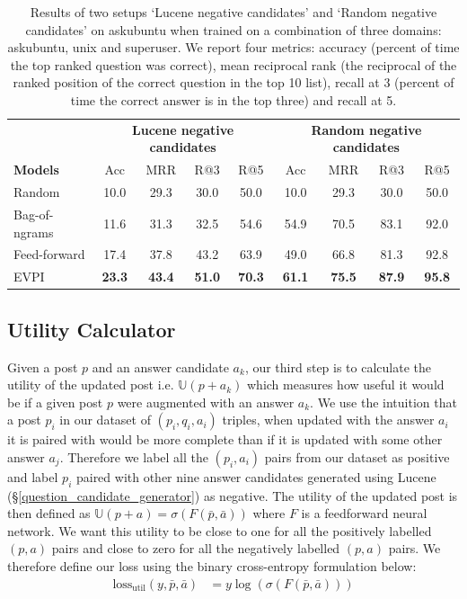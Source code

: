 \documentclass[11pt,a4paper]{article}
\newcommand{\U}{\mathbb{U}}
\begin{document}
\begin{table}[t]
	\small
	\centering
	\begin{tabular}{l|cccc|cccc}
		\toprule
		& \multicolumn{4}{c|}{\textbf{Lucene negative candidates}} & \multicolumn{4}{c}{\textbf{Random negative candidates}} \\
		\textbf{Models} & Acc & MRR & R@3 & R@5 & Acc & MRR & R@3 & R@5\\
		\midrule
		Random  & 10.0 & 29.3 & 30.0 & 50.0 &10.0 & 29.3 & 30.0 & 50.0 \\
		Bag-of-ngrams & 11.6 & 31.3 & 32.5 & 54.6 & 54.9 & 70.5 & 83.1 & 92.0 \\
		Feed-forward & 17.4 & 37.8 & 43.2 & 63.9 &  49.0 & 66.8 & 81.3 & 92.8 \\
		EVPI & \bf 23.3 & \bf 43.4 & \bf 51.0 & \bf 70.3 & \bf 61.1 & \bf 75.5 & \bf 87.9  & \bf 95.8  \\
		\bottomrule
	\end{tabular}
	\label{table:results_topN}
	\caption{Results of two setups `Lucene negative candidates' and `Random negative candidates' on askubuntu when trained on a combination of three domains: askubuntu, unix and superuser.  We report four metrics: accuracy (percent of time the top ranked question was correct),
		mean reciprocal rank (the reciprocal of the ranked position of the correct question in the top 10 list), recall at 3 (percent of time the correct answer is in the top three) and
		recall at 5.}
\end{table}

\subsection{Utility Calculator}\label{utility_calculator}
Given a post $p$ and an answer candidate $a_k$, our third step is to calculate the utility of the updated post i.e. $\U(p + a_k)$ which measures how useful it would be if a given post $p$ were augmented with an answer $a_k$. We use the intuition that a post $p_i$ in our dataset of $(p_i, q_i, a_i)$ triples, when updated with the answer $a_i$ it is paired with would be more complete than if it is updated with some other answer $a_j$. Therefore we label all the $(p_i, a_i)$ pairs from our dataset as positive and label $p_i$ paired with other nine answer candidates generated using Lucene (\S\ref{question_candidate_generator}) as negative.  The utility of the updated post is then defined as $\U(p+a) = \sigma ( F(\bar{p}, \bar{a}) )$ where $F$ is a feedforward neural network. We want this utility to be close to one for all the positively labelled $(p,a)$ pairs and close to zero for all the negatively labelled $(p, a)$ pairs. We therefore define our loss using the binary cross-entropy formulation below:
\begin{align}\label{eq_utility_calculator}
\textrm{loss}_{\textrm{util}}(y, \bar p, \bar a) &= y \log(\sigma (F(\bar{p}, \bar{a})))
\end{align}
\end{document}
